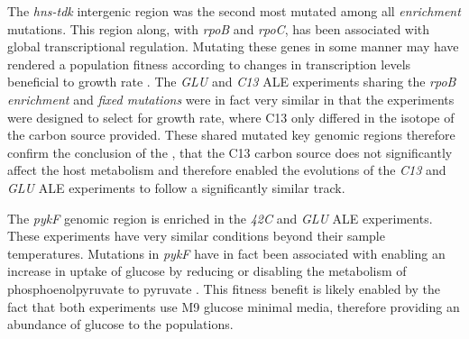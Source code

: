 \documentclass[12pt,final,masters,chapterheads]{ucsd}  %
\begin{document}
The \textit{hns-tdk} intergenic region was the second most mutated among all \textit{enrichment} mutations. This region along, with \textit{rpoB} and \textit{rpoC}, has been associated with global transcriptional regulation. Mutating these genes in some manner may have rendered a population fitness according to changes in transcription levels beneficial to growth rate \cite{Kobayashi01011990, AYERS1989749, Cheng2014, Wang1445}. The \textit{GLU} and \textit{C13} ALE experiments sharing the \textit{rpoB} \textit{enrichment} and \textit{fixed mutations} were in fact very similar in that the experiments were designed to select for growth rate, where C13 only differed in the isotope of the carbon source provided. These shared mutated key genomic regions therefore confirm the conclusion of the \cite{pmid26964043}, that the C13 carbon source does not significantly affect the host metabolism and therefore enabled the evolutions of the \textit{C13} and \textit{GLU} ALE experiments to follow a significantly similar track.

The \textit{pykF} genomic region is enriched in the \textit{42C} and \textit{GLU} ALE experiments. These experiments have very similar conditions beyond their sample temperatures. Mutations in \textit{pykF} have in fact been associated with enabling an increase in uptake of glucose by reducing or disabling the metabolism of phosphoenolpyruvate to pyruvate \cite{Woods13062006, 10.1371/journal.pgen.1001164, Blank25022014}. This fitness benefit is likely enabled by the fact that both experiments use M9 glucose minimal media, therefore providing an abundance of glucose to the populations.
\end{document}
